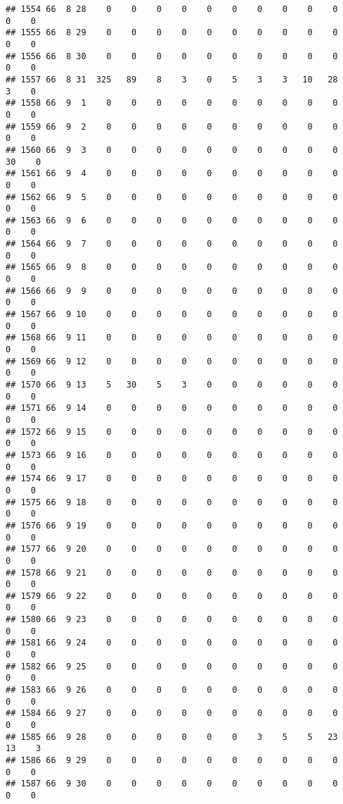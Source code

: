 \documentclass[]{article}
\begin{document}
\begin{verbatim}
## 1554 66  8 28    0    0    0    0    0    0    0    0    0    0    0    0
## 1555 66  8 29    0    0    0    0    0    0    0    0    0    0    0    0
## 1556 66  8 30    0    0    0    0    0    0    0    0    0    0    0    0
## 1557 66  8 31  325   89    8    3    0    5    3    3   10   28    3    0
## 1558 66  9  1    0    0    0    0    0    0    0    0    0    0    0    0
## 1559 66  9  2    0    0    0    0    0    0    0    0    0    0    0    0
## 1560 66  9  3    0    0    0    0    0    0    0    0    0    0   30    0
## 1561 66  9  4    0    0    0    0    0    0    0    0    0    0    0    0
## 1562 66  9  5    0    0    0    0    0    0    0    0    0    0    0    0
## 1563 66  9  6    0    0    0    0    0    0    0    0    0    0    0    0
## 1564 66  9  7    0    0    0    0    0    0    0    0    0    0    0    0
## 1565 66  9  8    0    0    0    0    0    0    0    0    0    0    0    0
## 1566 66  9  9    0    0    0    0    0    0    0    0    0    0    0    0
## 1567 66  9 10    0    0    0    0    0    0    0    0    0    0    0    0
## 1568 66  9 11    0    0    0    0    0    0    0    0    0    0    0    0
## 1569 66  9 12    0    0    0    0    0    0    0    0    0    0    0    0
## 1570 66  9 13    5   30    5    3    0    0    0    0    0    0    0    0
## 1571 66  9 14    0    0    0    0    0    0    0    0    0    0    0    0
## 1572 66  9 15    0    0    0    0    0    0    0    0    0    0    0    0
## 1573 66  9 16    0    0    0    0    0    0    0    0    0    0    0    0
## 1574 66  9 17    0    0    0    0    0    0    0    0    0    0    0    0
## 1575 66  9 18    0    0    0    0    0    0    0    0    0    0    0    0
## 1576 66  9 19    0    0    0    0    0    0    0    0    0    0    0    0
## 1577 66  9 20    0    0    0    0    0    0    0    0    0    0    0    0
## 1578 66  9 21    0    0    0    0    0    0    0    0    0    0    0    0
## 1579 66  9 22    0    0    0    0    0    0    0    0    0    0    0    0
## 1580 66  9 23    0    0    0    0    0    0    0    0    0    0    0    0
## 1581 66  9 24    0    0    0    0    0    0    0    0    0    0    0    0
## 1582 66  9 25    0    0    0    0    0    0    0    0    0    0    0    0
## 1583 66  9 26    0    0    0    0    0    0    0    0    0    0    0    0
## 1584 66  9 27    0    0    0    0    0    0    0    0    0    0    0    0
## 1585 66  9 28    0    0    0    0    0    0    3    5    5   23   13    3
## 1586 66  9 29    0    0    0    0    0    0    0    0    0    0    0    0
## 1587 66  9 30    0    0    0    0    0    0    0    0    0    0    0    0

\end{verbatim}
\end{document}
